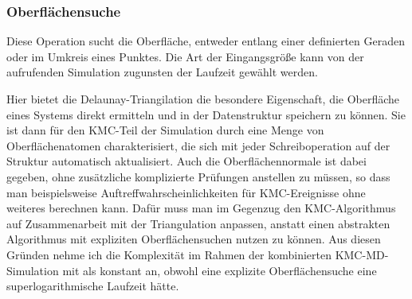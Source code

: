 \subsubsection{Oberflächensuche}
Diese Operation sucht die Oberfläche, entweder entlang einer definierten Geraden oder im Umkreis eines Punktes.
Die Art der Eingangsgröße kann von der aufrufenden Simulation zugunsten der Laufzeit gewählt werden.

Hier bietet die Delaunay-Triangilation die besondere Eigenschaft, die Oberfläche eines Systems direkt ermitteln und in der Datenstruktur speichern zu können.
Sie ist dann für den KMC-Teil der Simulation durch eine Menge von Oberflächenatomen charakterisiert, die sich mit jeder Schreiboperation auf der Struktur automatisch aktualisiert.
Auch die Oberflächennormale ist dabei gegeben, ohne zusätzliche komplizierte Prüfungen anstellen zu müssen, so dass man beispielsweise Auftreffwahrscheinlichkeiten für KMC-Ereignisse ohne weiteres berechnen kann.
Dafür muss man im Gegenzug den KMC-Algorithmus auf Zusammenarbeit mit der Triangulation anpassen, anstatt einen abstrakten Algorithmus mit expliziten Oberflächensuchen nutzen zu können.
Aus diesen Gründen nehme ich die Komplexität im Rahmen der kombinierten KMC-MD-Simulation mit  als konstant an, obwohl eine explizite Oberflächensuche eine superlogarithmische Laufzeit hätte.

